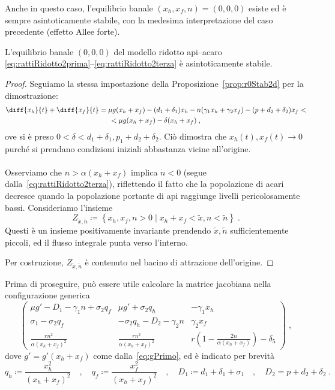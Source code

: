 Anche in questo caso, l'equilibrio banale $(x_h, x_f, n)=(0,0,0)$ esiste ed è sempre asintoticamente stabile, con la medesima interpretazione del caso precedente (effetto Allee forte).

\begin{proposizione}
L'equilibrio banale $(0,0,0)$ del modello ridotto
api--acaro \eqref{eq:rattiRidotto2prima}--\eqref{eq:rattiRidotto2terza}
è asintoticamente stabile.
\end{proposizione}

\begin{proof}
Seguiamo la stessa impostazione della Proposizione~\ref{prop:r0Stab2d} per la dimostrazione:
\begin{multline*}
\diff{x_h}{t} + \diff{x_f}{t} = \mu g (x_h + x_f) - (d_1 +\delta_1) x_h
- n( \gamma_1 x_h + \gamma_2 x_f ) - (p + d_2 + \delta_2) x_f < \\
< \mu g(x_h +x_f) - \delta (x_h + x_f) \; ,
\end{multline*}
ove si è preso $0< \delta < d_1 + \delta_1 , p_1 + d_2 + \delta_2$.
Ciò dimostra che $x_h(t), x_f(t) \to 0$ purché si prendano condizioni iniziali abbastanza vicine all'origine.

\paragraph{}
Osserviamo che $n > \alpha (x_h + x_f)$ implica $\dot{n} <0$ (segue dalla~\ref{eq:rattiRidotto2terza}),
riflettendo il fatto che la popolazione di acari decresce quando la popolazione portante di api
raggiunge livelli pericolosamente bassi. Consideriamo l'insieme
$$Z_{\tilde{x}, \tilde{n}} \coloneq \left\{ x_h, x_f, n > 0 \; | \; x_h + x_f < \tilde{x}, n < \tilde{n} \right\} \; .$$
Questi è un insieme positivamente invariante prendendo $\tilde{x}, \tilde{n}$ sufficientemente piccoli,
ed il flusso integrale punta verso l'interno.

Per costruzione, $Z_{\tilde{x}, \tilde{n}}$ è contenuto nel bacino di attrazione dell'origine.
\end{proof}

Prima di proseguire, può essere utile calcolare la matrice jacobiana nella configurazione
generica
\begin{equation}
    \begin{pmatrix}
    \mu g' - D_1 -\gamma_1 n + \sigma_2 q_f &
    \mu g' + \sigma_2 q_h &
    -\gamma_1 x_h
    \\
    \sigma_1 - \sigma_2 q_f &
    - \sigma_2 q_h - D_2 - \gamma_2 n &
    \gamma_2 x_f
    \\
    \frac{ r n^2 }{ \alpha (x_h + x_f)^2 } &
    \frac{ r n^2 }{ \alpha (x_h + x_f)^2 } &
    r \left(1-\frac{2n}{\alpha (x_h+x_f)} \right) -\delta_5
    \end{pmatrix}
    \; ,
\end{equation}
dove $g' = g'(x_h +x_f)$ come dalla~\eqref{eq:gPrimo}, ed è indicato per brevità
$$q_h \coloneq \frac{x_h^2}{(x_h+x_f)^2} \quad , \quad q_f \coloneq \frac{x_f^2}{(x_h+x_f)^2}
\quad , \quad D_1 \coloneq d_1 +\delta_1 +\sigma_1 \quad , \quad D_2 =  p +d_2 +\delta_2
\; .$$


